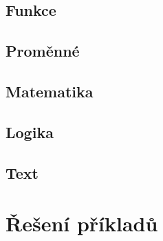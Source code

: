\subsection*{Funkce }
\begin{itemize}
	\blockFunctionDefinition
	\blockFunctionCall
\end{itemize}

\subsection*{Proměnné }
\begin{itemize}
	\blockVariableCreate
	\blockVariableChange
	\blockVariableGet
	\blockVariableSet
\end{itemize}

\subsection*{Matematika }
\begin{itemize}
	\blockMathOperation
	\blockMathTest
	\blockMathValue
	\blockMathConstant
	\blockMathRandom
\end{itemize}

\subsection*{Logika }
\begin{itemize}
	\blockLogicTrue
	\blockLogicFalse
	\blockLogicIf
	\blockLogicIfElse
	\blockLogicComparison
	\blockLogicOperator
\end{itemize}

\subsection*{Text }
\begin{itemize}
	\blockString
	\blockDisplayPrint
	\blockDisplayClear
\end{itemize}

\cleardoublepage

\section{Řešení příkladů}\label{cha:sol}

\printsolutions

\cleardoublepage

\nocite{*}
\printbibliography[title={Seznam použitých a doporučených zdrojů}]

